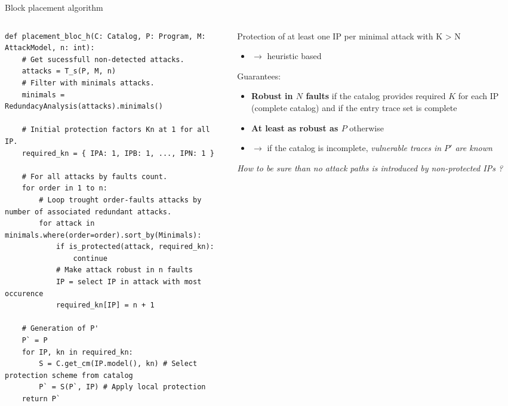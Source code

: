 \begin{frame}[fragile]{Block placement algorithm}
    \begin{columns}
        \begin{column}{0.5\textwidth}
            \begin{tiny}
                \lstset{style=custompython}
                \begin{lstlisting}
def placement_bloc_h(C: Catalog, P: Program, M: AttackModel, n: int):
    # Get sucessfull non-detected attacks.
    attacks = T_s(P, M, n)
    # Filter with minimals attacks.
    minimals = RedundacyAnalysis(attacks).minimals()
    
    # Initial protection factors Kn at 1 for all IP.
    required_kn = { IPA: 1, IPB: 1, ..., IPN: 1 }
            
    # For all attacks by faults count.
    for order in 1 to n:
        # Loop trought order-faults attacks by number of associated redundant attacks.
        for attack in minimals.where(order=order).sort_by(Minimals):
            if is_protected(attack, required_kn):
                continue
            # Make attack robust in n faults
            IP = select IP in attack with most occurence
            required_kn[IP] = n + 1

    # Generation of P'
    P` = P
    for IP, kn in required_kn:
        S = C.get_cm(IP.model(), kn) # Select protection scheme from catalog
        P` = S(P`, IP) # Apply local protection        
    return P`   \end{lstlisting}
            \end{tiny}
        \end{column}
        \begin{column}{0.5\textwidth}
        	\begin{tiny}
                Protection of at least one IP per minimal attack with K > N
                \begin{itemize}
                    \item [] $\rightarrow$ heuristic based
                \end{itemize}
                \vspace{0.6cm}
                
                Guarantees:
                \begin{itemize}
                    \item \textbf{Robust in $N$ faults} if the catalog provides required $K$ for each IP (complete catalog) and if the entry trace set is complete
                    \item \textbf{At least as robust as $P$} otherwise
                    \item[] $\rightarrow$ if the catalog is incomplete, \textit{vulnerable traces in $P'$ are known}
                \end{itemize}
                \vspace{1cm}
                \textit{How to be sure than no attack paths is introduced by non-protected IPs ?}
                

\end{tiny}
\end{column}
\end{columns}
\end{frame}

